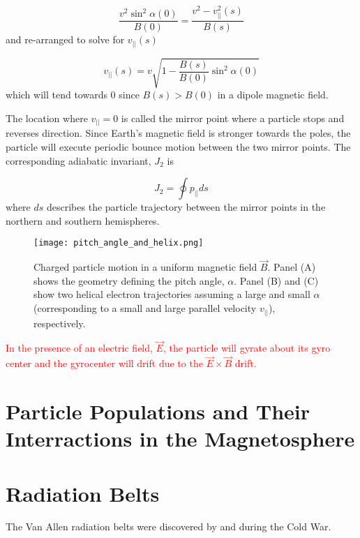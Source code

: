 \begin{equation}
\frac{v^2 \sin^2{\alpha(0)}}{B(0)} = \frac{v^2 - v^2_{||}(s)}{B(s)}
\end{equation} and re-arranged to solve for $v_{||}(s)$

\begin{equation}
v_{||}(s) = v \sqrt{1 - \frac{B(s)}{B(0)} \sin^2{\alpha(0)}}
\end{equation} which will tend towards 0 since $B(s) > B(0)$ in a dipole magnetic field.

The location where $v_{||} = 0$ is called the mirror point where a particle stops and reverses direction. Since Earth's magnetic field is stronger towards the poles, the particle will execute periodic bounce motion between the two mirror points. The corresponding adiabatic invariant, $J_2$ is

\begin{equation}
J_2 = \oint p_{||} ds
\end{equation} where $ds$ describes the particle trajectory between the mirror points in the northern and southern hemispheres.

\begin{figure}
\texttt{[image: pitch\_angle\_and\_helix.png]}
\caption{Charged particle motion in a uniform magnetic field $\vec{B}$. Panel (A) shows the geometry defining the pitch angle, $\alpha$. Panel (B) and (C) show two helical electron trajectories assuming a large and small $\alpha$ (corresponding to a small and large parallel velocity $v_{||}$), respectively.}
\label{Intro:pa}
\end{figure}


\textcolor{red}{In the presence of an electric field, $\vec{E}$, the particle will gyrate about its gyro center and the gyrocenter will drift due to the $\vec{E} \times \vec{B}$ drift.}

\section{Particle Populations and Their Interractions in the Magnetosphere}\label{ntro:particle_populations}

\section{Radiation Belts}\label{Intro:radiation_belt}
The Van Allen radiation belts were discovered by \citet{Allen1959} and \citet{Vernov1960} during the Cold War.

